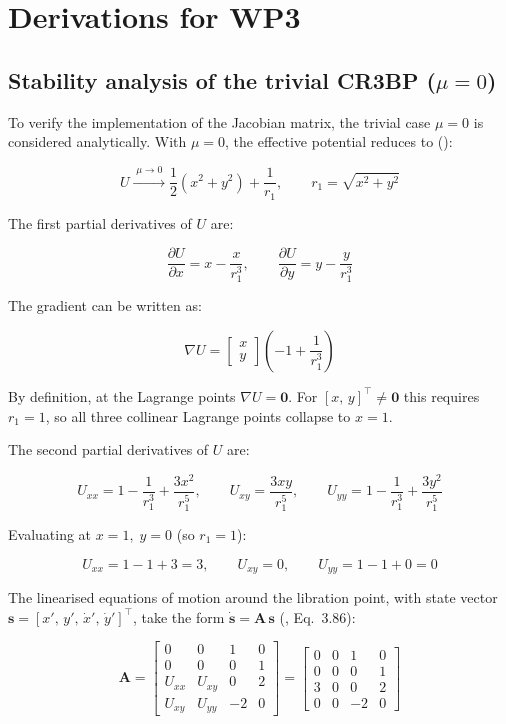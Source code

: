 \chapter{Derivations for WP3}
\label{chapter:derivations-wp3}

\section{Stability analysis of the trivial CR3BP ($\mu = 0$)}
\label{sec:trivial-cr3bp}

To verify the implementation of the Jacobian matrix, the trivial case $\mu = 0$ is considered analytically. With $\mu = 0$, the effective potential reduces to (\parencite{wakker2015fundamentals}):

$$
U \xrightarrow{\;\mu \to 0\;} \frac{1}{2}(x^2 + y^2) + \frac{1}{r_1}, \qquad r_1 = \sqrt{x^2 + y^2}
$$

The first partial derivatives of $U$ are:

$$
\frac{\partial U}{\partial x} = x - \frac{x}{r_1^3}, \qquad \frac{\partial U}{\partial y} = y - \frac{y}{r_1^3}
$$

The gradient can be written as:

$$
\nabla U = \begin{bmatrix} x \\ y \end{bmatrix} \left( -1 + \frac{1}{r_1^3} \right)
$$

By definition, at the Lagrange points $\nabla U = \mathbf{0}$. For $[x,\,y]^{\top} \neq \mathbf{0}$ this requires $r_1 = 1$, so all three collinear Lagrange points collapse to $x = 1$.

The second partial derivatives of $U$ are:

$$
U_{xx} = 1 - \frac{1}{r_1^3} + \frac{3x^2}{r_1^5}, \qquad U_{xy} = \frac{3xy}{r_1^5}, \qquad U_{yy} = 1 - \frac{1}{r_1^3} + \frac{3y^2}{r_1^5}
$$

Evaluating at $x = 1,\; y = 0$ (so $r_1 = 1$):

$$
U_{xx} = 1 - 1 + 3 = 3, \qquad U_{xy} = 0, \qquad U_{yy} = 1 - 1 + 0 = 0
$$

The linearised equations of motion around the libration point, with state vector $\boldsymbol{s} = [x',\, y',\, \dot{x}',\, \dot{y}']^{\top}$, take the form $\dot{\boldsymbol{s}} = \mathbf{A}\,\boldsymbol{s}$ (\parencite{wakker2015fundamentals}, Eq.~3.86):

$$
\mathbf{A} =
\begin{bmatrix}
    0      & 0      & 1  & 0 \\
    0      & 0      & 0  & 1 \\
    U_{xx} & U_{xy} & 0  & 2 \\
    U_{xy} & U_{yy} & -2 & 0
\end{bmatrix}
=
\begin{bmatrix}
    0 & 0 &  1 & 0 \\
    0 & 0 &  0 & 1 \\
    3 & 0 &  0 & 2 \\
    0 & 0 & -2 & 0
\end{bmatrix}
$$

